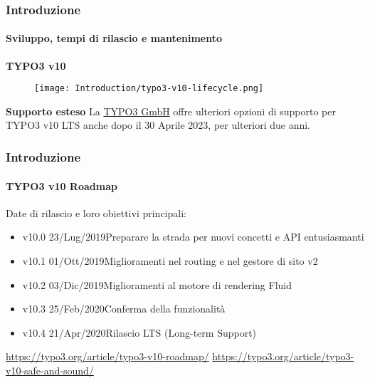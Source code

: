 
\begin{frame}[fragile]
	\frametitle{Introduzione}
	\framesubtitle{Sviluppo, tempi di rilascio e mantenimento}

	\textbf{TYPO3 v10}

	\begin{figure}
		\texttt{[image: Introduction/typo3-v10-lifecycle.png]}
	\end{figure}

	\textbf{Supporto esteso}\newline
	\smaller
		La \href{https://typo3.com}{TYPO3 GmbH} offre ulteriori opzioni di supporto
		per TYPO3 v10 LTS anche dopo il 30 Aprile 2023, per ulteriori due anni.
	\normalsize

\end{frame}


\begin{frame}[fragile]
	\frametitle{Introduzione}
	\framesubtitle{TYPO3 v10 Roadmap}

	Date di rilascio e loro obiettivi principali:

	\begin{itemize}

		\item v10.0 \tabto{1.1cm}23/Lug/2019\tabto{3.4cm}Preparare la strada per nuovi concetti e API entusiasmanti
		\item v10.1 \tabto{1.1cm}01/Ott/2019\tabto{3.4cm}Miglioramenti nel routing e nel gestore di sito v2
		\item v10.2 \tabto{1.1cm}03/Dic/2019\tabto{3.4cm}Miglioramenti al motore di rendering Fluid
		\item
			\begingroup
				\color{typo3orange}
				v10.3 \tabto{1.1cm}25/Feb/2020\tabto{3.4cm}Conferma della funzionalità
			\endgroup
		\item v10.4 \tabto{1.1cm}21/Apr/2020\tabto{3.4cm}Rilascio LTS (Long-term Support)

	\end{itemize}

	\vspace{0.6cm}
	\smaller
		\url{https://typo3.org/article/typo3-v10-roadmap/}\newline
		\url{https://typo3.org/article/typo3-v10-safe-and-sound/}
	\normalsize

\end{frame}

